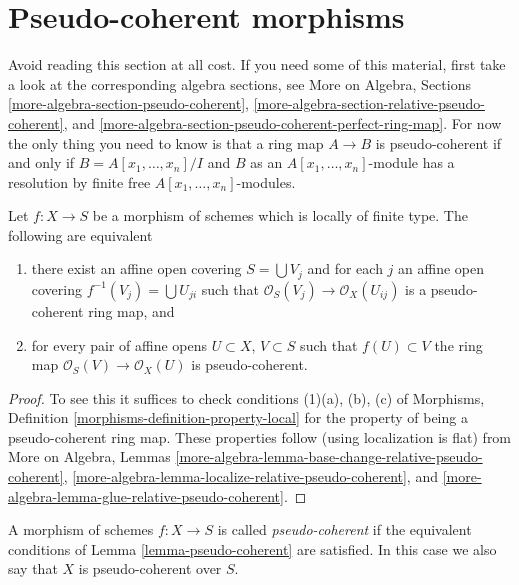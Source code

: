 












\section{Pseudo-coherent morphisms}
\label{section-pseudo-coherent}

\noindent
Avoid reading this section at all cost.
If you need some of this material, first take a look at the
corresponding algebra sections, see
More on Algebra, Sections \ref{more-algebra-section-pseudo-coherent},
\ref{more-algebra-section-relative-pseudo-coherent}, and
\ref{more-algebra-section-pseudo-coherent-perfect-ring-map}.
For now the only thing you need to know is that a ring map
$A \to B$ is pseudo-coherent if and only if $B = A[x_1, \ldots, x_n]/I$
and $B$ as an $A[x_1, \ldots, x_n]$-module has a resolution by
finite free $A[x_1, \ldots, x_n]$-modules.

\begin{lemma}
\label{lemma-pseudo-coherent}
Let $f : X \to S$ be a morphism of schemes which is locally of finite type.
The following are equivalent
\begin{enumerate}
\item there exist an affine open covering $S = \bigcup V_j$ and for each $j$
an affine open covering $f^{-1}(V_j) = \bigcup U_{ji}$ such that
$\mathcal{O}_S(V_j) \to \mathcal{O}_X(U_{ij})$ is a pseudo-coherent
ring map, and
\item for every pair of affine opens $U \subset X$, $V \subset S$
such that $f(U) \subset V$ the ring map
$\mathcal{O}_S(V) \to \mathcal{O}_X(U)$ is pseudo-coherent.
\end{enumerate}
\end{lemma}

\begin{proof}
To see this it suffices to check conditions (1)(a), (b), (c) of
Morphisms, Definition \ref{morphisms-definition-property-local}
for the property of being a pseudo-coherent ring map.
These properties follow (using localization is flat) from
More on Algebra, Lemmas
\ref{more-algebra-lemma-base-change-relative-pseudo-coherent},
\ref{more-algebra-lemma-localize-relative-pseudo-coherent}, and
\ref{more-algebra-lemma-glue-relative-pseudo-coherent}.
\end{proof}

\begin{definition}
\label{definition-pseudo-coherent}
A morphism of schemes $f : X \to S$ is called {\it pseudo-coherent}
if the equivalent conditions of
Lemma \ref{lemma-pseudo-coherent}
are satisfied. In this case we also say that $X$ is pseudo-coherent
over $S$.
\end{definition}

